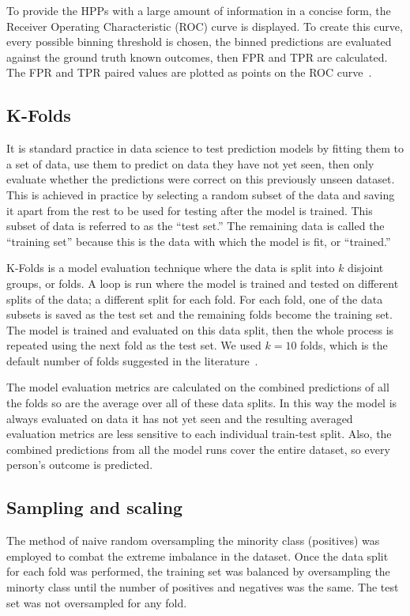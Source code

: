 \documentclass[10pt,letterpaper]{article}
\begin{document}
To provide the HPPs with a large amount of information in a concise form, the Receiver Operating Characteristic (ROC) curve is displayed. To create this curve, every possible binning threshold is chosen, the binned predictions are evaluated against the ground truth known outcomes, then FPR and TPR are calculated. The FPR and TPR paired values are plotted as points on the ROC curve~\cite{fawcett2006introduction}.

\subsection*{K-Folds}
It is standard practice in data science to test prediction models by fitting them to a set of data, use them to predict on data they have not yet seen, then only evaluate whether the predictions were correct on this previously unseen dataset. This is achieved in practice by selecting a random subset of the data and saving it apart from the rest to be used for testing after the model is trained. This subset of data is referred to as the ``test set.'' The remaining data is called the ``training set'' because this is the data with which the model is fit, or ``trained.'' 

K-Folds is a model evaluation technique where the data is split into $k$ disjoint groups, or folds. A loop is run where the model is trained and tested on different splits of the data; a different split for each fold. For each fold, one of the data subsets is saved as the test set and the remaining folds become the training set. The model is trained and evaluated on this data split, then the whole process is repeated using the next fold as the test set. We used $k = 10$ folds, which is the default number of folds suggested in the literature~\cite{marcot2020optimal}.

The model evaluation metrics are calculated on the combined predictions of all the folds so are the average over all of these data splits. In this way the model is always evaluated on data it has not yet seen and the resulting averaged evaluation metrics are less sensitive to each individual train-test split. Also, the combined predictions from all the model runs cover the entire dataset, so every person's outcome is predicted.

\subsection*{Sampling and scaling}
The method of naive random oversampling the minority class (positives) was employed to combat the extreme imbalance in the dataset. Once the data split for each fold was performed, the training set was balanced by oversampling the minorty class until the number of positives and negatives was the same. The test set was not oversampled for any fold.
\end{document}
